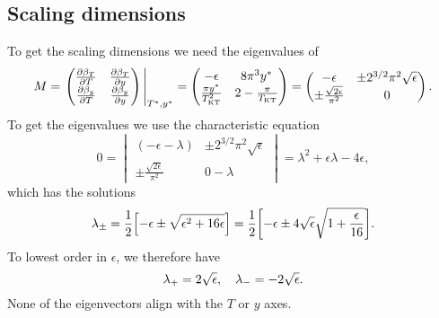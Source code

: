 \documentclass[11pt,letter, swedish, english
]{article}
\begin{document}
\subsection{Scaling dimensions}
To get the scaling dimensions we need the eigenvalues of 
\begin{equation}
M = \eval{
\begin{pmatrix}
\pdv{\beta_T}{T} & \pdv{\beta_T}{y}\\
\pdv{\beta_y}{T} & \pdv{\beta_y}{y}
\end{pmatrix}
}_{T^*, y^*}
=
\begin{pmatrix}
-\epsilon & 8\pi^3 y^*\\
\frac{\pi y^*}{\TKT^2} & 2-\frac{\pi}{\TKT}
\end{pmatrix}
=
\begin{pmatrix}
-\epsilon & \pm2^{3/2}\pi^2\sqrt{\epsilon}\\
\pm \frac{\sqrt{2\epsilon}}{\pi^2} & 0
\end{pmatrix}.
\end{equation}
To get the eigenvalues we use the characteristic equation
\begin{equation}
0=
\begin{vmatrix}
(-\epsilon -\lambda) & \pm2^{3/2}\pi^2\sqrt{\epsilon}\\
\pm \frac{\sqrt{2\epsilon}}{\pi^2} & 0-\lambda
\end{vmatrix}
= \lambda^2 + \epsilon\lambda - 4\epsilon,
\end{equation}
which has the solutions
\begin{equation}
\lambda_\pm = \frac{1}{2}\qty[ -\epsilon
\pm\sqrt{\epsilon^2 + 16\epsilon}]
= \frac{1}{2}\qty[ -\epsilon
\pm4\sqrt{\epsilon}\sqrt{1+\frac{\epsilon}{16}}].
\end{equation}
To lowest order in $\epsilon$, we therefore have
\begin{equation}
\lambda_+ =  2\sqrt{\epsilon}\qcomma
\lambda_- = -2\sqrt{\epsilon}.
\end{equation}
None of the eigenvectors align with the $T$ or $y$ axes.
\end{document}
